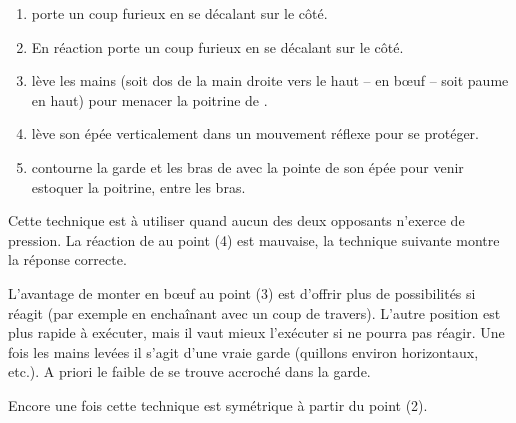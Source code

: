 \begin{technique}

\begin{enumerate}
	\item \A porte un coup furieux en se décalant sur le côté.
	
	\item En réaction \D porte un coup furieux en se décalant sur le côté.
	
	\item \D lève les mains (soit dos de la main droite vers le haut – en bœuf – soit paume en haut) pour menacer la poitrine de \A.
	
	\item \A lève son épée verticalement dans un mouvement réflexe pour se protéger.
	
	\item \D contourne la garde et les bras de \A avec la pointe de son épée pour venir estoquer la poitrine, entre les bras.
\end{enumerate}

Cette technique est à utiliser quand aucun des deux opposants n'exerce de pression.
La réaction de \A au point (4) est mauvaise, la technique suivante montre la réponse correcte.

L'avantage de monter en bœuf au point (3) est d'offrir plus de possibilités si \A réagit (par exemple en enchaînant avec un coup de travers).
L'autre position est plus rapide à exécuter, mais il vaut mieux l'exécuter si \A ne pourra pas réagir.
Une fois les mains levées il s'agit d'une vraie garde (quillons environ horizontaux, etc.).
A priori le faible de \A se trouve accroché dans la garde.

Encore une fois cette technique est symétrique à partir du point (2).

\end{technique}


